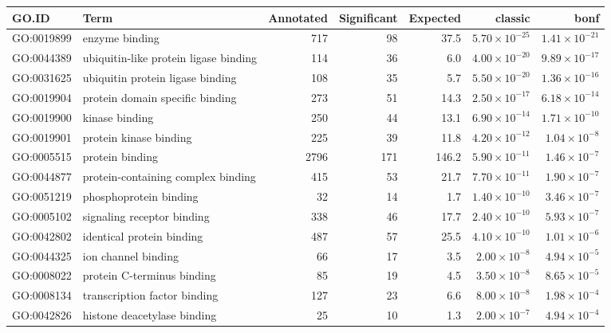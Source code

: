 \begin{table}[ht]
\centering
\begin{adjustbox}{max width=\textwidth}
\begin{tabular}{llrrrrr}
  \hline
GO.ID & Term & Annotated & Significant & Expected & classic & bonf \\ 
  \hline
GO:0019899 & enzyme binding & 717 & 98 & 37.5 & $5.70 \times 10^{-25}$ & $1.41 \times 10^{-21}$ \\ 
  GO:0044389 & ubiquitin-like protein ligase binding & 114 & 36 & 6.0 & $4.00 \times 10^{-20}$ & $9.89 \times 10^{-17}$ \\ 
  GO:0031625 & ubiquitin protein ligase binding & 108 & 35 & 5.7 & $5.50 \times 10^{-20}$ & $1.36 \times 10^{-16}$ \\ 
  GO:0019904 & protein domain specific binding & 273 & 51 & 14.3 & $2.50 \times 10^{-17}$ & $6.18 \times 10^{-14}$ \\ 
  GO:0019900 & kinase binding & 250 & 44 & 13.1 & $6.90 \times 10^{-14}$ & $1.71 \times 10^{-10}$ \\ 
  GO:0019901 & protein kinase binding & 225 & 39 & 11.8 & $4.20 \times 10^{-12}$ & $1.04 \times 10^{-8}$ \\ 
  GO:0005515 & protein binding & 2796 & 171 & 146.2 & $5.90 \times 10^{-11}$ & $1.46 \times 10^{-7}$ \\ 
  GO:0044877 & protein-containing complex binding & 415 & 53 & 21.7 & $7.70 \times 10^{-11}$ & $1.90 \times 10^{-7}$ \\ 
  GO:0051219 & phosphoprotein binding & 32 & 14 & 1.7 & $1.40 \times 10^{-10}$ & $3.46 \times 10^{-7}$ \\ 
  GO:0005102 & signaling receptor binding & 338 & 46 & 17.7 & $2.40 \times 10^{-10}$ & $5.93 \times 10^{-7}$ \\ 
  GO:0042802 & identical protein binding & 487 & 57 & 25.5 & $4.10 \times 10^{-10}$ & $1.01 \times 10^{-6}$ \\ 
  GO:0044325 & ion channel binding & 66 & 17 & 3.5 & $2.00 \times 10^{-8}$ & $4.94 \times 10^{-5}$ \\ 
  GO:0008022 & protein C-terminus binding & 85 & 19 & 4.5 & $3.50 \times 10^{-8}$ & $8.65 \times 10^{-5}$ \\ 
  GO:0008134 & transcription factor binding & 127 & 23 & 6.6 & $8.00 \times 10^{-8}$ & $1.98 \times 10^{-4}$ \\ 
  GO:0042826 & histone deacetylase binding & 25 & 10 & 1.3 & $2.00 \times 10^{-7}$ & $4.94 \times 10^{-4}$ \\ 

\end{tabular}
\end{adjustbox}
\end{table}
